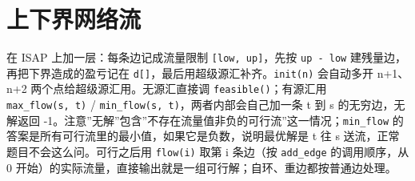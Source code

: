 \section{上下界网络流}
在 ISAP 上加一层：每条边记成流量限制 \texttt{{[}low,\ up{]}}，先按 \texttt{up\ -\ low} 建残量边，再把下界造成的盈亏记在 \texttt{d{[}{]}}，最后用超级源汇补齐。\texttt{init(n)} 会自动多开 n+1、n+2 两个点给超级源汇用。无源汇直接调 \texttt{feasible()}；有源汇用 \texttt{max\_flow(s,\ t)} / \texttt{min\_flow(s,\ t)}，两者内部会自己加一条 t 到 s 的无穷边，无解返回 -1。注意''无解''包含''不存在流量值非负的可行流''这一情况；\texttt{min\_flow} 的答案是所有可行流里的最小值，如果它是负数，说明最优解是 t 往 s 送流，正常题目不会这么问。可行之后用 \texttt{flow(i)} 取第 i 条边（按 \texttt{add\_edge} 的调用顺序，从 0 开始）的实际流量，直接输出就是一组可行解；自环、重边都按普通边处理。



